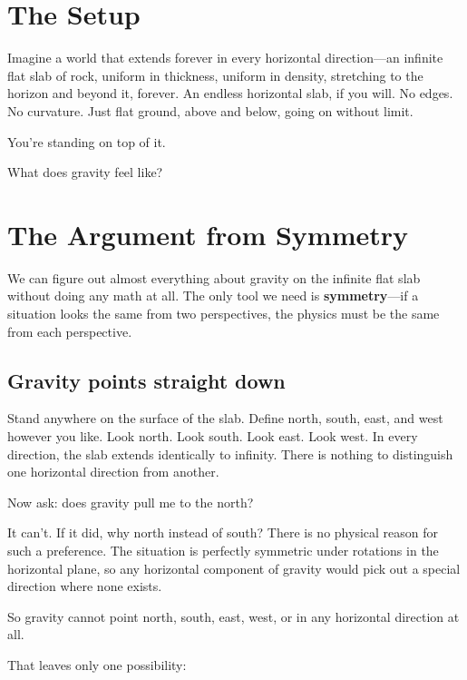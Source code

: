\documentclass[11pt, letterpaper]{article}
\begin{document}
\section*{The Setup}

Imagine a world that extends forever in every horizontal direction---an infinite flat slab of rock, uniform in thickness, uniform in density, stretching to the horizon and beyond it, forever. An endless horizontal slab, if you will. No edges. No curvature. Just flat ground, above and below, going on without limit.

You're standing on top of it.

What does gravity feel like?


\section{The Argument from Symmetry}

We can figure out almost everything about gravity on the infinite flat slab without doing any math at all. The only tool we need is \textbf{symmetry}---if a situation looks the same from two perspectives, the physics must be the same from each perspective.

\subsection{Gravity points straight down}

Stand anywhere on the surface of the slab. Define north, south, east, and west however you like. Look north. Look south. Look east. Look west. In every direction, the slab extends identically to infinity. There is nothing to distinguish one horizontal direction from another.

Now ask: does gravity pull me to the north?

It can't. If it did, why north instead of south? There is no physical reason for such a preference. The situation is perfectly symmetric under rotations in the horizontal plane, so any horizontal component of gravity would pick out a special direction where none exists.

So gravity cannot point north, south, east, west, or in any horizontal direction at all.

That leaves only one possibility:
\end{document}
